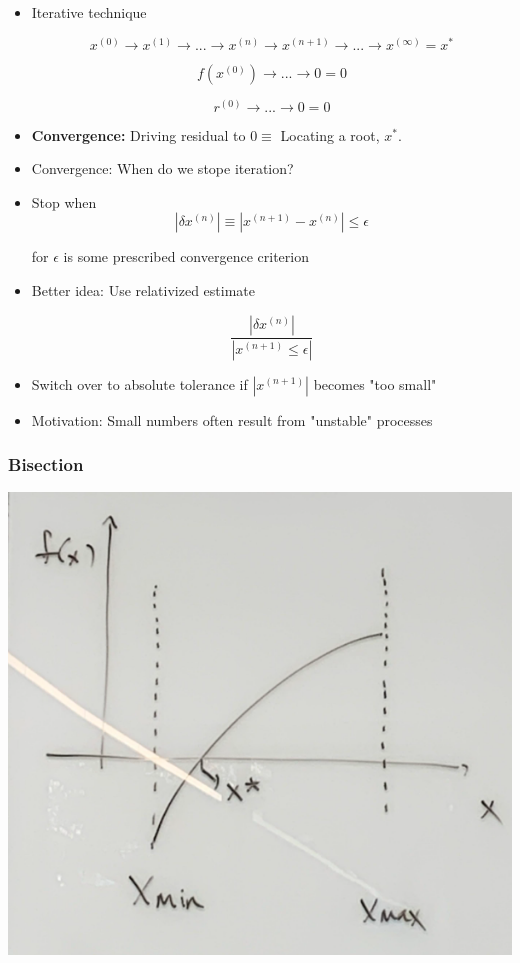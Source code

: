 \begin{itemize}
    \item Iterative technique

    \[ x^{(0)} \rightarrow x^{(1)} \rightarrow ... \rightarrow x^{(n)} \rightarrow x^{(n+1)} \rightarrow ... \rightarrow x^{(\infty)} = x^*\]

    \[ f(x^{(0)}) \rightarrow ... \rightarrow 0 = 0\]

    \[ r^{(0)} \rightarrow ... \rightarrow 0 = 0 \]


    \item \textbf{Convergence:} Driving residual to $0\equiv$ Locating a root, $x^*$.

    \item Convergence: When do we stope iteration?

    \item Stop when
    \begin{equation}
        |\delta x^{(n)}| \equiv |x^{(n+1)} - x^{(n)}| \leq \epsilon
    \end{equation}

    for $\epsilon$ is some prescribed convergence criterion

    \item Better idea: Use relativized estimate
    
    \begin{equation}
        \frac{|\delta x^{(n)}|}{|x^{(n+1)} \leq \epsilon|}
    \end{equation}

    \item Switch over to absolute tolerance if $|x^{(n+1)}|$ becomes "too small"
    \item Motivation: Small numbers often result from "unstable" processes
\end{itemize}

\subsubsection{Bisection}

\includegraphics[width = 0.3 \linewidth]{Images/410Notes_Bisection.png}

